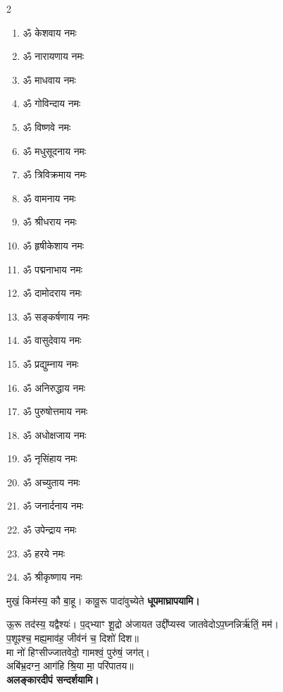 \begin{center}
\begin{multicols}{2}
\begin{enumerate}
\item ॐ केशवाय नमः
\item ॐ नारायणाय नमः
\item ॐ माधवाय नमः
\item ॐ गोविन्दाय नमः
\item ॐ विष्णवे नमः	
\item ॐ मधुसूदनाय नमः
\item ॐ त्रिविक्रमाय नमः
\item ॐ वामनाय नमः
\item ॐ श्रीधराय नमः
\item ॐ हृषीकेशाय नमः
\item ॐ पद्मनाभाय नमः
\item ॐ दामोदराय नमः
\item ॐ सङ्कर्षणाय नमः
\item ॐ वासुदेवाय नमः
\item ॐ प्रद्युम्नाय नमः
\item ॐ अनिरुद्धाय नमः
\item ॐ पुरुषोत्तमाय नमः
\item ॐ अधोक्षजाय नमः
\item ॐ नृसिंहाय नमः
\item ॐ अच्युताय नमः
\item ॐ जनार्दनाय नमः
\item ॐ उपेन्द्राय नमः
\item ॐ हरये नमः
\item ॐ श्रीकृष्णाय नमः
\end{enumerate}
\end{multicols}
\clearpage

\begingroup
\setlength{\columnseprule}{1pt}
\let\chapt\sect
\begingroup

\endgroup

\endgroup

\closesub


{मुखं॒ किम॑स्य॒ कौ बा॒हू। कावू॒रू पादा॑वुच्येते}
\textbf{\devAya{} धूपमाघ्रापयामि।}
\medskip

{ऊ॒रू तद॑स्य॒ यद्वैश्यः॑। प॒द्भ्याꣳ शू॒द्रो अ॑जायत}
उद्दी᳚प्यस्व जातवेदोऽप॒घ्नन्निर्ऋ॑तिं॒ मम॑।\\
प॒शूꣴश्च॒ मह्य॒माव॑ह॒ जीव॑नं च॒ दिशो॑ दिश॥\\
मा नो॑ हिꣳसीज्जातवेदो॒ गामश्वं॒ पुरु॑षं॒ जग॑त्।\\
अबि॑भ्र॒दग्न॒ आग॑हि श्रि॒या मा॒ परि॑पातय॥\\
\textbf{\devAya{} अलङ्कारदीपं सन्दर्शयामि।}
\medskip


\end{center}
